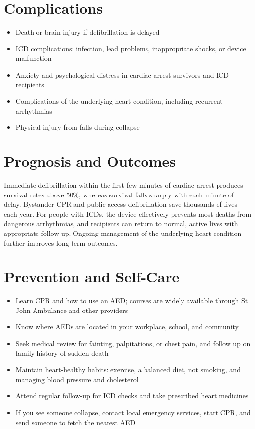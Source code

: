 \section*{Complications}
\begin{itemize}
    \item Death or brain injury if defibrillation is delayed
    \item ICD complications: infection, lead problems, inappropriate shocks, or device malfunction
    \item Anxiety and psychological distress in cardiac arrest survivors and ICD recipients
    \item Complications of the underlying heart condition, including recurrent arrhythmias
    \item Physical injury from falls during collapse
\end{itemize}

\section*{Prognosis and Outcomes}
Immediate defibrillation within the first few minutes of cardiac arrest produces survival rates above 50\%, whereas survival falls sharply with each minute of delay. Bystander CPR and public-access defibrillation save thousands of lives each year. For people with ICDs, the device effectively prevents most deaths from dangerous arrhythmias, and recipients can return to normal, active lives with appropriate follow-up. Ongoing management of the underlying heart condition further improves long-term outcomes.

\section*{Prevention and Self-Care}
\begin{itemize}
    \item Learn CPR and how to use an AED; courses are widely available through St John Ambulance and other providers
    \item Know where AEDs are located in your workplace, school, and community
    \item Seek medical review for fainting, palpitations, or chest pain, and follow up on family history of sudden death
    \item Maintain heart-healthy habits: exercise, a balanced diet, not smoking, and managing blood pressure and cholesterol
    \item Attend regular follow-up for ICD checks and take prescribed heart medicines
    \item If you see someone collapse, contact local emergency services, start CPR, and send someone to fetch the nearest AED
\end{itemize}

